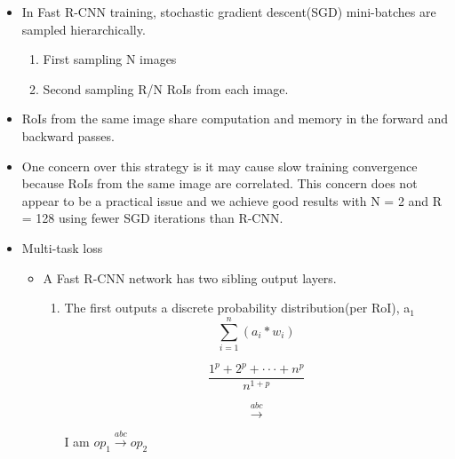 \documentclass[11pt]{article}
\begin{document}
\begin{itemize}
\item In Fast R-CNN training, stochastic gradient descent(SGD) mini-batches are sampled 
      hierarchically.
\begin{enumerate}
\item First sampling N images
\item Second sampling R/N RoIs from each image.
\end{enumerate}
\item RoIs from the same image share computation and memory in the forward and backward
      passes.
\item One concern over this strategy is it may cause slow training convergence because
      RoIs from the same image are correlated. This concern does not appear to be a 
      practical issue and we achieve good results with N = 2 and R = 128 using fewer
      SGD iterations than R-CNN.
\end{itemize}
\begin{itemize}

\item Multi-task loss\\
\label{sec-2-1-3-1}%
\begin{itemize}
\item A Fast R-CNN network has two sibling output layers.
\begin{enumerate}
\item The first outputs a discrete probability distribution(per RoI), 
          a$_{1}$
          \begin{equation}
            \sum\limits_{i=1}^n(a_i*w_i)
          \end{equation}

          \begin{equation}
            \frac{1^p+2^p+\cdot\cdot\cdot+n^p}{n^{1+p}}
          \end{equation}
          
          \begin{equation}
            \stackrel{abc}{\longrightarrow}
          \end{equation}

          I am $op_1\stackrel{abc}{\longrightarrow}op_2$
\end{enumerate}
\end{itemize}
          
          
          
\end{itemize} %
\end{document}
